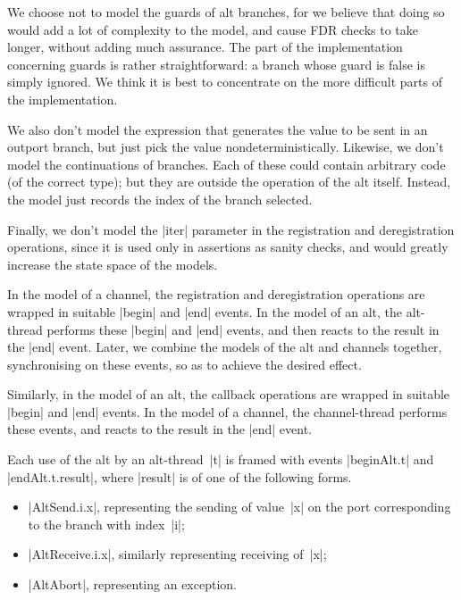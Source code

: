 We choose not to model the guards of alt branches, for we believe that doing
so would add a lot of complexity to the model, and cause FDR checks to take
longer, without adding much assurance.  The part of the implementation
concerning guards is rather straightforward: a branch whose guard is false is
simply ignored.  We think it is best to concentrate on the more difficult
parts of the implementation.

We also don't model the expression that generates the value to be sent in an
outport branch, but just pick the value nondeterministically.  Likewise, we
don't model the continuations of branches.  Each of these could contain
arbitrary code (of the correct type); but they are outside the operation of
the alt itself.  Instead, the model just records the index of the branch
selected. 
 
Finally, we don't model the |iter| parameter in the registration and
deregistration operations, since it is used only in assertions as sanity
checks, and would greatly increase the state space of the models.

In the model of a channel, the registration and deregistration operations are
wrapped in suitable |begin| and |end| events.  In the model of an alt, the
alt-thread performs these |begin| and |end| events, and then reacts to the
result in the |end| event.  Later, we combine the models of the alt and
channels together, synchronising on these events, so as to achieve the desired
effect.

Similarly, in the model of an alt, the callback operations are wrapped in
suitable |begin| and |end| events.  In the model of a channel, the
channel-thread performs these events, and reacts to the result in the |end|
event.  

Each use of the alt by an alt-thread~|t| is framed with events |beginAlt.t|
and |endAlt.t.result|, where |result| is of one of the following forms.
%
\begin{itemize}
\item |AltSend.i.x|, representing the sending of value~|x| on the port
  corresponding to the branch with index~|i|;

\item |AltReceive.i.x|, similarly representing receiving of~|x|;

\item |AltAbort|, representing an  exception.
\end{itemize}
